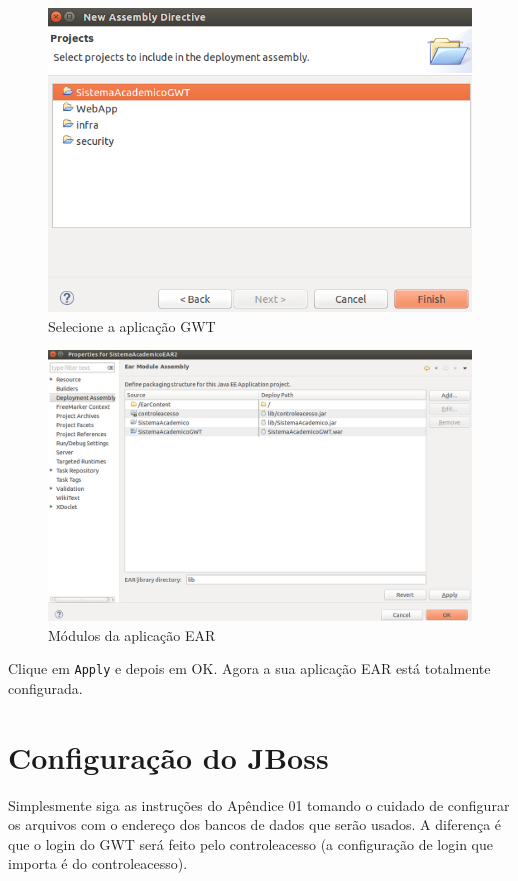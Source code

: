 \begin{figure}[H]
	\centering
	\includegraphics[scale=0.5]{files/imgs/gwt-09.png}
	\caption{Selecione a aplicação GWT}
	\label{gwt09}
\end{figure}

\begin{figure}[H]
	\centering
	\includegraphics[scale=0.4]{files/imgs/gwt-10.png}
	\caption{Módulos da aplicação EAR}
	\label{gwt10}
\end{figure}

Clique em \texttt{Apply} e depois em OK. Agora a sua aplicação EAR está totalmente configurada.

\section{Configuração do JBoss}
Simplesmente siga as instruções do Apêndice 01 tomando o cuidado de configurar
os arquivos com o endereço dos bancos de dados que serão usados. A diferença é
que o login do GWT será feito pelo controleacesso (a configuração de login que
importa é do controleacesso).

